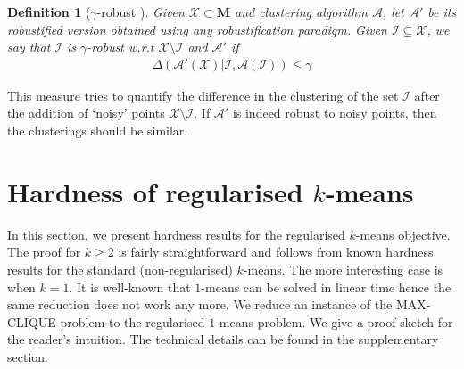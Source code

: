 \documentclass[12pt]{article}
\newcommand{\mc}{\mathcal}
\newcommand{\mb}{\mathbf}
\newtheorem{definition}[theorem]{Definition}
\begin{document}
\begin{definition}[$\gamma$-robust \cite{ben2014clustering}]
Given $\mc X\subset \mb M$ and clustering algorithm $\mc A$, let $\mc A'$ be its robustified version obtained using any robustification paradigm. Given $\mc I \subseteq \mc X$, we say that $\mc I$ is $\gamma$-robust w.r.t $\mc X \setminus \mc I$ and $\mc A'$ if 
\begin{align}
\Delta(\mc A'(\mc X)|\mc I, \mc A(\mc I)) \le \gamma
\end{align}
\end{definition}
This measure tries to quantify the difference in the clustering of the set $\mc I$ after the addition of `noisy' points $\mc X \setminus \mc I$. If $\mc A'$ is indeed robust to noisy points, then the clusterings should be similar. 



\section{Hardness of regularised $k$-means}
\label{section:hardness}

In this section, we present hardness results for the regularised $k$-means objective. 
The proof for $k \ge 2$ is fairly straightforward and follows from known hardness results for the standard (non-regularised) $k$-means. The more interesting case is when $k = 1$. It is well-known that $1$-means can be solved in linear time \cite{Bellman73} hence the same reduction does not work any more. We reduce an instance of the MAX-CLIQUE problem to the regularised $1$-means problem. We give a proof sketch for the reader's intuition. The technical details can be found in the supplementary section.

\end{document}
